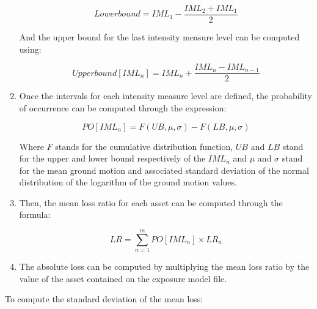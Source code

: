 \begin{enumerate}
\begin{equation}
Lower bound= IML_1-\frac{IML_2+IML_{1}}{2}
\end{equation}

And the upper bound for the last intensity measure level can be computed using:

\begin{equation}
Upper bound[IML_{n}]  = IML_{n}+\frac{IML_{n}-IML_{n-1}}{2}
\end{equation}

\item Once the intervals for each intensity measure level are defined, the probability of occurrence can be computed through the expression:

\begin{equation}
PO[IML_{n}]  = F(UB,\mu,\sigma)-F(LB,\mu,\sigma)
\end{equation}

Where $F$ stands for the cumulative distribution function, $UB$ and $LB$ stand for the upper and lower bound respectively of the $IML_n$ and $\mu$ and $\sigma$ stand for the mean ground motion and associated standard deviation of the normal distribution of the logarithm of the ground motion values.

\item Then, the mean loss ratio for each asset can be computed through the formula:

\begin{equation}
LR  = \sum_{n=1}^mPO[IML_n] \times LR_n
\end{equation}

\item The absolute loss can be computed by multiplying the mean loss ratio by the value of the asset contained on the exposure model file.

\end{enumerate}

To compute the standard deviation of the mean loss:

